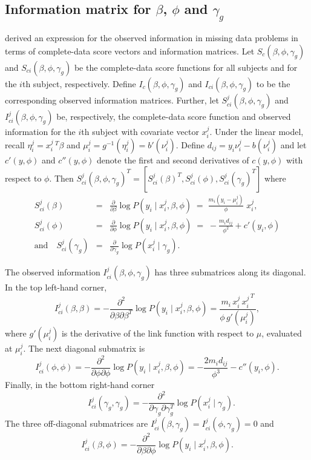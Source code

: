 \documentclass[article, shortnames]{jss}
\begin{document}
\subsection*{Information matrix for  $\beta$, $\phi$ and $\gamma_g$}

\citet{Louis82} derived an expression for the observed information
in missing data problems in terms of complete-data score vectors and 
information matrices.
Let $S_c(\beta,\phi,\gamma_g)$ and $S_{ci}(\beta,\phi, \gamma_g)$
be the complete-data score functions for all subjects
and for the $i$th subject, respectively.
Define $I_c(\beta, \phi, \gamma_g)$ and $I_{ci}(\beta, \phi, \gamma_g)$
to be the corresponding observed information matrices.
Further, let $S^j_{ci}(\beta,\phi,\gamma_g)$
and $I^j_{ci}(\beta, \phi, \gamma_g)$
be, respectively, the complete-data
score function and observed information
for the $i$th subject with covariate vector $x^j_i$.
Under the linear model,
recall $\eta^j_i = x^j_i \, ^T \beta$ and $\mu^j_i=g^{-1}(\eta^j_i)=
b'(\nu^j_i)$. Define $d_{ij}= y_i \nu_i^j - b(\nu_i^j)$ and
let $c'(y,\phi)$ and $c''(y,\phi)$ denote
the first and second derivatives of $c(y, \phi)$ with respect to $\phi$.
Then $S^j_{ci}(\beta,\phi,\gamma_g)^T =
   \left[ S^j_{ci}(\beta)^T,S^j_{ci}(\phi),S^j_{ci}(\gamma_g)^T\right]$
where
\begin{eqnarray*}
S^j_{ci}(\beta) & = &
      \frac{\partial}{\partial \beta} \log P(y_i \mid x^j_i, \beta,\phi)
\; = \; \frac{m_i(y_i - \mu^j_i)}{\phi} \; x^j_i, \\
S^j_{ci}(\phi) & = &
      \frac{\partial}{\partial \phi} \log P(y_i \mid x^j_i, \beta,\phi)
\; = \; -\frac{m_i d_{ij}}{\phi^2} + c'(y_i,\phi) \\
\mbox{and} \quad S^j_{ci}(\gamma_g) &= &
      \frac{\partial}{\partial \gamma_g} \log P(x^j_i \mid \gamma_g).
\end{eqnarray*}

The observed information
$I^j_{ci}(\beta, \phi, \gamma_g)$
has three submatrices along its diagonal.
In the top left-hand corner,
$$
     I^j_{ci}(\beta,\beta)  =
     - \frac{\partial^2}{\partial \beta \partial \beta^T}
               \log P(y_i \mid x^j_i, \beta,\phi) =
\frac {m_i \, x^j_i \, {x^j_i}^{\,T}} {\phi \, g'( \mu^j_i)},
$$
where
$g'(\mu^j_i)$ is the derivative of the link function
with respect to $\mu$,
evaluated at $\mu^j_i$.
The next diagonal submatrix is
$$
     I^j_{ci}(\phi,\phi)=
     -\frac{\partial^2}{\partial \phi \partial \phi}
               \log P(y_i \mid x^j_i, \beta,\phi) =
-\frac{2 m_i d_{ij}}{\phi^3} - c''(y_i,\phi).$$
Finally, in the bottom right-hand corner
$$
\quad I^j_{ci}(\gamma_g,\gamma_g)=
     -\frac{\partial^2}{\partial \gamma_g \partial \gamma_g^T}
               \log P(x^j_i \mid \gamma_g).
$$
The three off-diagonal submatrices
are $I^j_{ci}(\beta,\gamma_g) = I^j_{ci}(\phi,\gamma_g) = 0$
and
$$
     I^j_{ci}(\beta,\phi)  =
     -\frac{\partial^2}{\partial \beta \partial \phi}
               \log P(y_i \mid x^j_i, \beta,\phi).
$$
\end{document}
